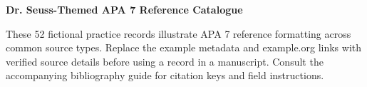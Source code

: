 \documentclass[12pt,letterpaper]{article}
\begin{document}
\begin{center}
\textbf{Dr. Seuss-Themed APA 7 Reference Catalogue}
\end{center}
\noindent These 52 fictional practice records illustrate APA 7 reference
formatting across common source types. Replace the example metadata and
example.org links with verified source details before using a record in a
manuscript. Consult the accompanying bibliography guide for citation keys
and field instructions.
\nocite{*}
\printbibliography[title={Practice References}]
\end{document}
